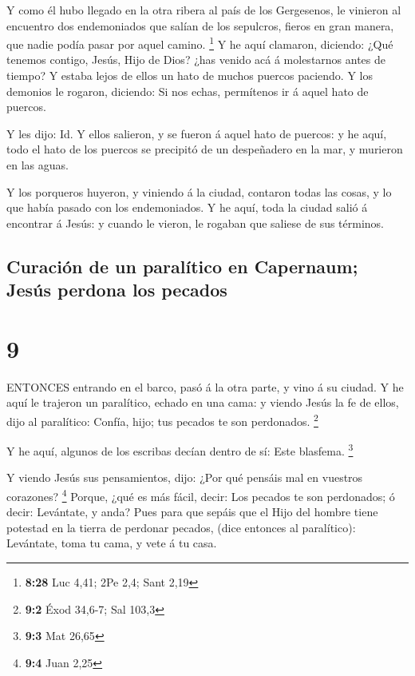  Y como él hubo llegado en la otra ribera al país de los
Gergesenos, le vinieron al encuentro dos endemoniados que salían de los
sepulcros, fieros en gran manera, que nadie podía pasar por aquel
camino. \footnote{\textbf{8:28} Luc 4,41; 2Pe 2,4; Sant 2,19}
 Y he aquí clamaron, diciendo: ¿Qué tenemos contigo, Jesús,
Hijo de Dios? ¿has venido acá á molestarnos antes de tiempo?
 Y estaba lejos de ellos un hato de muchos puercos
paciendo.  Y los demonios le rogaron, diciendo: Si nos
echas, permítenos ir á aquel hato de puercos.

 Y les dijo: Id. Y ellos salieron, y se fueron á aquel hato
de puercos: y he aquí, todo el hato de los puercos se precipitó de un
despeñadero en la mar, y murieron en las aguas.

 Y los porqueros huyeron, y viniendo á la ciudad, contaron
todas las cosas, y lo que había pasado con los endemoniados.
 Y he aquí, toda la ciudad salió á encontrar á Jesús: y
cuando le vieron, le rogaban que saliese de sus términos.

\hypertarget{curaciuxf3n-de-un-paraluxedtico-en-capernaum-jesuxfas-perdona-los-pecados}{%
\subsection{Curación de un paralítico en Capernaum; Jesús perdona los
pecados}\label{curaciuxf3n-de-un-paraluxedtico-en-capernaum-jesuxfas-perdona-los-pecados}}

\hypertarget{section-8}{%
\section{9}\label{section-8}}

 ENTONCES entrando en el barco, pasó á la otra parte, y vino
á su ciudad.  Y he aquí le trajeron un paralítico, echado en
una cama: y viendo Jesús la fe de ellos, dijo al paralítico: Confía,
hijo; tus pecados te son perdonados. \footnote{\textbf{9:2} Éxod 34,6-7;
  Sal 103,3}

 Y he aquí, algunos de los escribas decían dentro de sí:
Este blasfema. \footnote{\textbf{9:3} Mat 26,65}

 Y viendo Jesús sus pensamientos, dijo: ¿Por qué pensáis mal
en vuestros corazones? \footnote{\textbf{9:4} Juan 2,25} 
Porque, ¿qué es más fácil, decir: Los pecados te son perdonados; ó
decir: Levántate, y anda?  Pues para que sepáis que el Hijo
del hombre tiene potestad en la tierra de perdonar pecados, (dice
entonces al paralítico): Levántate, toma tu cama, y vete á tu casa.

